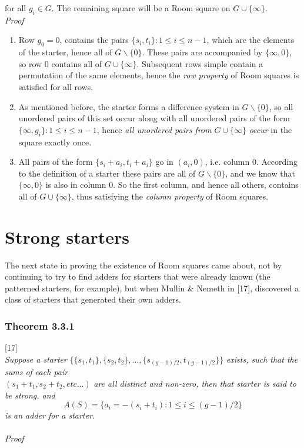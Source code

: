 \documentclass[
  12pt,
  a4paper]{book}
\begin{document}
for all \(g_i \in G\). The remaining square will be a Room square on
\(G \cup \{\infty\}\).\\
\emph{Proof}

\begin{enumerate}
\def\labelenumi{\arabic{enumi}.}
\item
  Row \(g_0=0\), contains the pairs \(\{s_i,t_i\}:1 \leq i \leq n-1\),
  which are the elements of the starter, hence all of
  \(G \backslash \{0\}\). These pairs are accompanied by \(\{\infty,0\}\),
  so row 0 contains all of \(G \cup \{\infty\}\). Subsequent rows simple
  contain a permutation of the same elements, hence the \emph{row property}
  of Room squares is satisfied for all rows.
\item
  As mentioned before, the starter forms a difference system in
  \(G \backslash \{0\}\), so all unordered pairs of this set occur along
  with all unordered pairs of the form
  \(\{\infty,g_i\}: 1 \leq i \leq n-1\), hence \emph{all unordered pairs
  from} \(G \cup \{\infty\}\) \emph{occur} in the square exactly once.
\item
  All pairs of the form \(\{s_i+a_i,t_i+a_i\}\) go in \((a_i,0)\), i.e.
  column 0. According to the definition of a starter these pairs are
  all of \(G \backslash \{0\}\), and we know that \(\{\infty,0\}\) is also
  in column 0. So the first column, and hence all others, contains all
  of \(G \cup \{\infty\}\), thus satisfying the \emph{column property} of
  Room squares.
\end{enumerate}

\hypertarget{strong-starters}{%
\section{Strong starters}\label{strong-starters}}

The next state in proving the existence of Room squares came about, not
by continuing to try to find adders for starters that were already known
(the patterned starters, for example), but when Mullin \& Nemeth in {[}17{]},
discovered a class of starters that generated their own adders.

\hypertarget{theorem-3.3.1}{%
\subsubsection{Theorem 3.3.1}\label{theorem-3.3.1}}

{[}17{]}\\
\emph{Suppose a starter}
\(\{\{s_1,t_1\},\{s_2,t_2\},...,\{s_{(g-1)/2},t_{(g-1)/2}\}\}\) \emph{exists,
such that the sums of each pair}\\
\((s_1+t_1,s_2+t_2, etc...)\) \emph{are all distinct and non-zero, then that
starter is said to be strong, and}
\[A(S)=\{a_i = -(s_i+t_i):1 \leq i \leq (g-1)/2\}\] \emph{is an adder for a
starter.\\
~\\
Proof}
\end{document}
